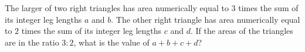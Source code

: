 The larger of two right triangles has area numerically equal to $3$ times the sum of its integer leg lengths $a$ and $b$. The other right triangle has area numerically equal to $2$ times the sum of its integer leg lengths $c$ and $d$. If the areas of the triangles are in the ratio $3:2$, what is the value of $a+b+c+d$?
